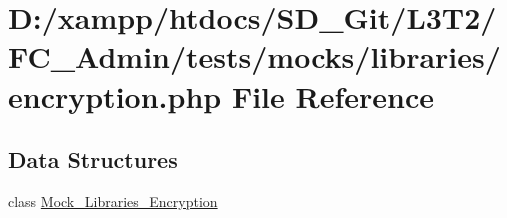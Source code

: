 \hypertarget{tests_2mocks_2libraries_2_encryption_8php}{}\section{D\+:/xampp/htdocs/\+S\+D\+\_\+\+Git/\+L3\+T2/\+F\+C\+\_\+\+Admin/tests/mocks/libraries/encryption.php File Reference}
\label{tests_2mocks_2libraries_2_encryption_8php}
\subsection*{Data Structures}
\begin{DoxyCompactItemize}
\item 
class \hyperlink{class_mock___libraries___encryption}{Mock\+\_\+\+Libraries\+\_\+\+Encryption}
\end{DoxyCompactItemize}
